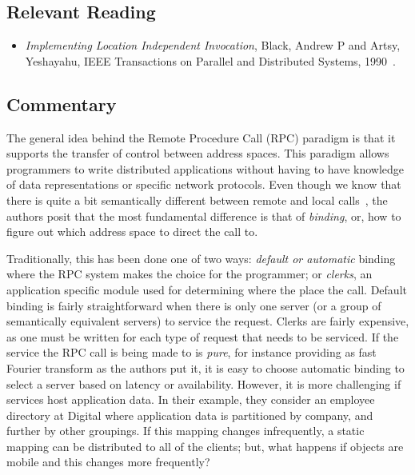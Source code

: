 \subsection{Relevant Reading}

\begin{itemize}
	\item \textit{Implementing Location Independent Invocation}, Black, Andrew P and Artsy, Yeshayahu, IEEE Transactions on Parallel and Distributed Systems, 1990~\cite{black1990implementing}.
\end{itemize}

\subsection{Commentary}

The general idea behind the Remote Procedure Call (RPC) paradigm is that it supports the transfer of control between address spaces.  This paradigm allows programmers to write distributed applications without having to have knowledge of data representations or specific network protocols.  Even though we know that there is quite a bit semantically different between remote and local calls~\cite{kendall1994note, black1990implementing}, the authors posit that the most fundamental difference is that of \textit{binding}, or, how to figure out which address space to direct the call to.

Traditionally, this has been done one of two ways: \textit{default or automatic} binding where the RPC system makes the choice for the programmer; or \textit{clerks}, an application specific module used for determining where the place the call.  Default binding is fairly straightforward when there is only one server (or a group of semantically equivalent servers) to service the request.  Clerks are fairly expensive, as one must be written for each type of request that needs to be serviced.  If the service the RPC call is being made to is \textit{pure}, for instance providing as fast Fourier transform as the authors put it, it is easy to choose automatic binding to select a server based on latency or availability.  However, it is more challenging if services host application data.  In their example, they consider an employee directory at Digital where application data is partitioned by company, and further by other groupings.  If this mapping changes infrequently, a static mapping can be distributed to all of the clients; but, what happens if objects are mobile and this changes more frequently?

